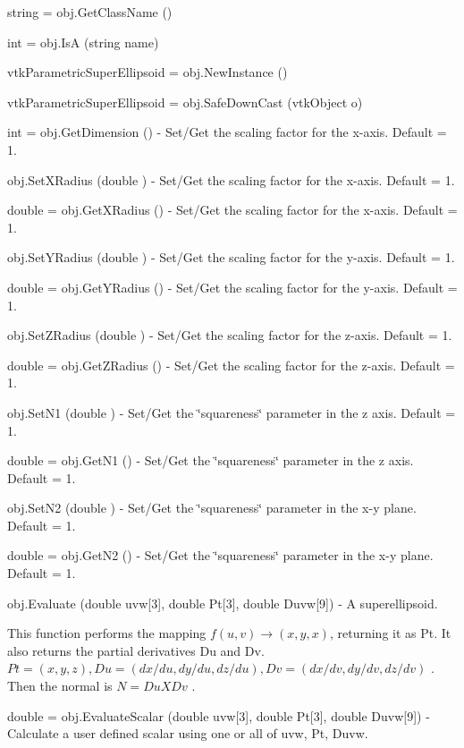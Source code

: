 \begin{DoxyItemize}
\item {\ttfamily string = obj.\-Get\-Class\-Name ()}  
\item {\ttfamily int = obj.\-Is\-A (string name)}  
\item {\ttfamily vtk\-Parametric\-Super\-Ellipsoid = obj.\-New\-Instance ()}  
\item {\ttfamily vtk\-Parametric\-Super\-Ellipsoid = obj.\-Safe\-Down\-Cast (vtk\-Object o)}  
\item {\ttfamily int = obj.\-Get\-Dimension ()} -\/ Set/\-Get the scaling factor for the x-\/axis. Default = 1.  
\item {\ttfamily obj.\-Set\-X\-Radius (double )} -\/ Set/\-Get the scaling factor for the x-\/axis. Default = 1.  
\item {\ttfamily double = obj.\-Get\-X\-Radius ()} -\/ Set/\-Get the scaling factor for the x-\/axis. Default = 1.  
\item {\ttfamily obj.\-Set\-Y\-Radius (double )} -\/ Set/\-Get the scaling factor for the y-\/axis. Default = 1.  
\item {\ttfamily double = obj.\-Get\-Y\-Radius ()} -\/ Set/\-Get the scaling factor for the y-\/axis. Default = 1.  
\item {\ttfamily obj.\-Set\-Z\-Radius (double )} -\/ Set/\-Get the scaling factor for the z-\/axis. Default = 1.  
\item {\ttfamily double = obj.\-Get\-Z\-Radius ()} -\/ Set/\-Get the scaling factor for the z-\/axis. Default = 1.  
\item {\ttfamily obj.\-Set\-N1 (double )} -\/ Set/\-Get the \char`\"{}squareness\char`\"{} parameter in the z axis. Default = 1.  
\item {\ttfamily double = obj.\-Get\-N1 ()} -\/ Set/\-Get the \char`\"{}squareness\char`\"{} parameter in the z axis. Default = 1.  
\item {\ttfamily obj.\-Set\-N2 (double )} -\/ Set/\-Get the \char`\"{}squareness\char`\"{} parameter in the x-\/y plane. Default = 1.  
\item {\ttfamily double = obj.\-Get\-N2 ()} -\/ Set/\-Get the \char`\"{}squareness\char`\"{} parameter in the x-\/y plane. Default = 1.  
\item {\ttfamily obj.\-Evaluate (double uvw\mbox{[}3\mbox{]}, double Pt\mbox{[}3\mbox{]}, double Duvw\mbox{[}9\mbox{]})} -\/ A superellipsoid.

This function performs the mapping $f(u,v) \rightarrow (x,y,x)$, returning it as Pt. It also returns the partial derivatives Du and Dv. $Pt = (x, y, z), Du = (dx/du, dy/du, dz/du), Dv = (dx/dv, dy/dv, dz/dv)$ . Then the normal is $N = Du X Dv$ .  
\item {\ttfamily double = obj.\-Evaluate\-Scalar (double uvw\mbox{[}3\mbox{]}, double Pt\mbox{[}3\mbox{]}, double Duvw\mbox{[}9\mbox{]})} -\/ Calculate a user defined scalar using one or all of uvw, Pt, Duvw.


\end{DoxyItemize}
